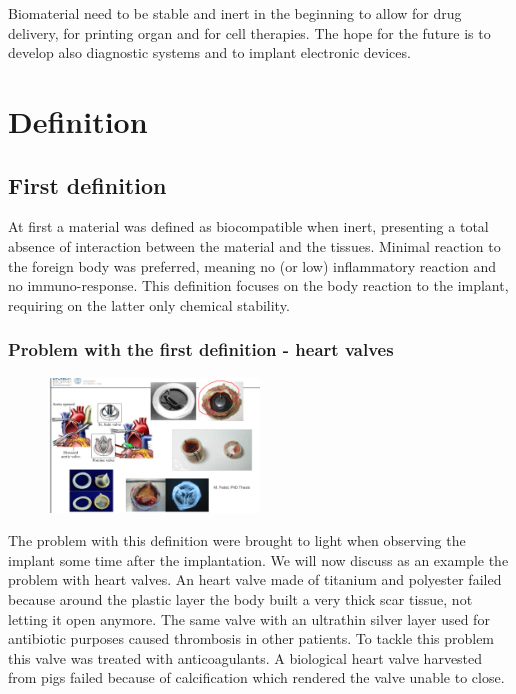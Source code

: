 	Biomaterial need to be stable and inert in the beginning to allow for drug delivery, for printing organ and for cell therapies.
	The hope for the future is to develop also diagnostic systems and to implant electronic devices.

\section{Definition}

	\subsection{First definition}
	At first a material was defined as biocompatible when inert, presenting a total absence of interaction between the material and the tissues.
	Minimal reaction to the foreign body was preferred, meaning no (or low) inflammatory reaction and no immuno-response.
	This definition focuses on the body reaction to the implant, requiring on the latter only chemical stability.

		\subsubsection{Problem with the first definition - heart valves}

		\begin{figure}[ht]
			\centering
			\includegraphics[width=0.5\textwidth]{valves.png}
			\caption{\label{fig:valves}}
		\end{figure}

		The problem with this definition were brought to light when observing the implant some time after the implantation.
		We will now discuss as an example the problem with heart valves.
		An heart valve made of titanium and polyester failed because around the plastic layer the body built a very thick scar tissue, not letting it open anymore.
		The same valve with an ultrathin silver layer used for antibiotic purposes caused thrombosis in other patients.
		To tackle this problem this valve was treated with anticoagulants.
		A biological heart valve harvested from pigs failed because of calcification which rendered the valve unable to close.


